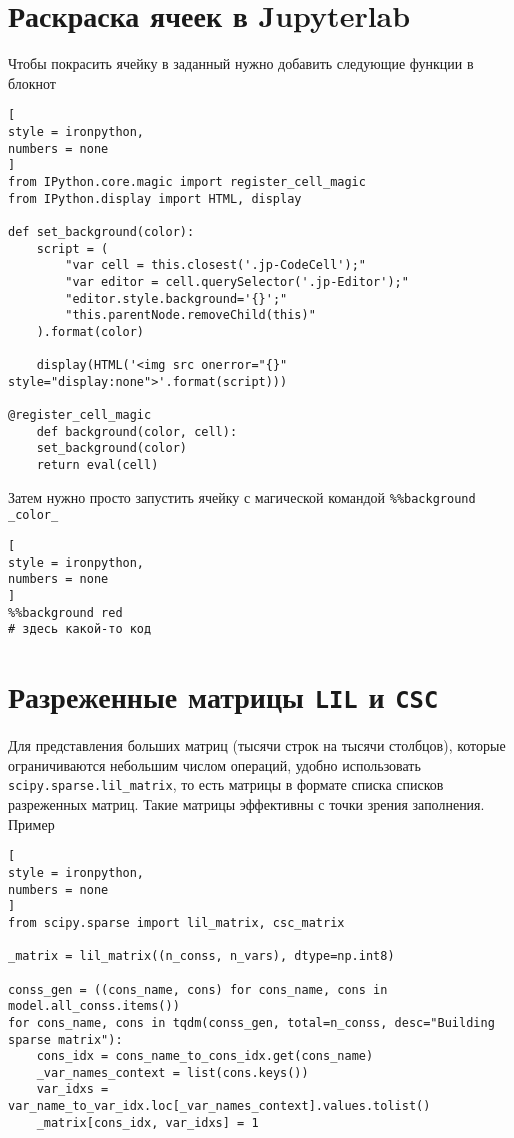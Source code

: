 \documentclass[%
	11pt,
	a4paper,
	utf8,
		]{article}
\begin{document}
\section{Раскраска ячеек в Jupyterlab}

Чтобы покрасить ячейку в заданный нужно добавить следующие функции в блокнот
\begin{lstlisting}[
style = ironpython,
numbers = none
]
from IPython.core.magic import register_cell_magic
from IPython.display import HTML, display

def set_background(color):    
	script = (
		"var cell = this.closest('.jp-CodeCell');"
		"var editor = cell.querySelector('.jp-Editor');"
		"editor.style.background='{}';"
		"this.parentNode.removeChild(this)"
	).format(color)

	display(HTML('<img src onerror="{}" style="display:none">'.format(script)))

@register_cell_magic
	def background(color, cell):
	set_background(color)
	return eval(cell)
\end{lstlisting}

Затем нужно просто запустить ячейку с магической командой \verb|%%background _color_|
\begin{lstlisting}[
style = ironpython,
numbers = none
]
%%background red
# здесь какой-то код
\end{lstlisting}

\section{Разреженные матрицы \texttt{LIL} и \texttt{CSC}}

Для представления больших матриц (тысячи строк на тысячи столбцов), которые ограничиваются небольшим числом операций, удобно использовать \verb|scipy.sparse.lil_matrix|, то есть матрицы в формате списка списков разреженных матриц. Такие матрицы эффективны с точки зрения заполнения. Пример
\begin{lstlisting}[
style = ironpython,
numbers = none
]
from scipy.sparse import lil_matrix, csc_matrix

_matrix = lil_matrix((n_conss, n_vars), dtype=np.int8)

conss_gen = ((cons_name, cons) for cons_name, cons in model.all_conss.items())
for cons_name, cons in tqdm(conss_gen, total=n_conss, desc="Building sparse matrix"):
	cons_idx = cons_name_to_cons_idx.get(cons_name)
	_var_names_context = list(cons.keys())
	var_idxs = var_name_to_var_idx.loc[_var_names_context].values.tolist()
	_matrix[cons_idx, var_idxs] = 1
\end{lstlisting}
\end{document}
